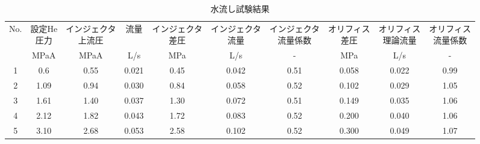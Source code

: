 \begin{table}[htb]
\begin{center}
\caption{水流し試験結果}
\scriptsize
\begin{tabular}{|c|c|c|c|c|c|c|c|c|c|} \hline
No. & \shortstack{設定He\\圧力} & \shortstack{インジェクタ\\上流圧} & 流量 & \shortstack{インジェクタ\\差圧} & \shortstack{インジェクタ\\流量} & \shortstack{インジェクタ\\流量係数} & \shortstack{オリフィス\\差圧} & \shortstack{オリフィス\\理論流量} & \shortstack{オリフィス\\流量係数} \\ \cline{2-10}
 & MPaA & MPaA & L/s & MPa & L/s & - & MPa & L/s & - \\ \hline
1 & 0.6 & 0.55 & 0.021 & 0.45 & 0.042 & 0.51 & 0.058 & 0.022 & 0.99 \\ \hline
2 & 1.09 & 0.94 & 0.030 & 0.84 & 0.058 & 0.52 & 0.102 & 0.029 & 1.05 \\ \hline
3 & 1.61 & 1.40 & 0.037 & 1.30 & 0.072 & 0.51 & 0.149 & 0.035 & 1.06 \\ \hline
4 & 2.12 & 1.82 & 0.043 & 1.72 & 0.083 & 0.52 & 0.200 & 0.040 & 1.06 \\ \hline
5 & 3.10 & 2.68 & 0.053 & 2.58 & 0.102 & 0.52 & 0.300 & 0.049 & 1.07 \\ \hline
\end{tabular}
\label{tab:Water}
\end{center}
\end{table}


